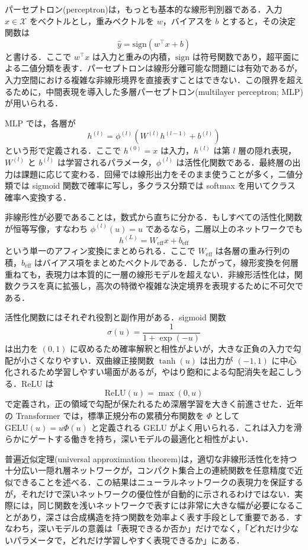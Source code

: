 パーセプトロン(perceptron)は，もっとも基本的な線形判別器である．入力 $x\in\mathcal X$ をベクトルとし，重みベクトルを $w$，バイアスを $b$ とすると，その決定関数は
\[
\hat y = \mathrm{sign}(w^\top x + b)
\]
と書ける．ここで $w^\top x$ は入力と重みの内積，$\mathrm{sign}$ は符号関数であり，超平面による二値分類を表す．パーセプトロンは線形分離可能な問題には有効であるが，入力空間における複雑な非線形境界を直接表すことはできない．この限界を超えるために，中間表現を導入した多層パーセプトロン(multilayer perceptron; MLP)が用いられる．

MLP では，各層が
\[
h^{(l)} = \phi^{(l)}(W^{(l)}h^{(l-1)} + b^{(l)})
\]
という形で定義される．ここで $h^{(0)}=x$ は入力，$h^{(l)}$ は第 $l$ 層の隠れ表現，$W^{(l)}$ と $b^{(l)}$ は学習されるパラメータ，$\phi^{(l)}$ は活性化関数である．最終層の出力は課題に応じて変わる．回帰では線形出力をそのまま使うことが多く，二値分類では sigmoid 関数で確率に写し，多クラス分類では softmax を用いてクラス確率へ変換する．

非線形性が必要であることは，数式から直ちに分かる．もしすべての活性化関数が恒等写像，すなわち $\phi^{(l)}(u)=u$ であるなら，二層以上のネットワークでも
\[
h^{(L)} = W_{\mathrm{eff}}x + b_{\mathrm{eff}}
\]
という単一のアフィン変換にまとめられる．ここで $W_{\mathrm{eff}}$ は各層の重み行列の積，$b_{\mathrm{eff}}$ はバイアス項をまとめたベクトルである．したがって，線形変換を何層重ねても，表現力は本質的に一層の線形モデルを超えない．非線形活性化は，関数クラスを真に拡張し，高次の特徴や複雑な決定境界を表現するために不可欠である．

活性化関数にはそれぞれ役割と副作用がある．sigmoid 関数
\[
\sigma(u)=\frac{1}{1+\exp(-u)}
\]
は出力を $(0,1)$ に収めるため確率解釈と相性がよいが，大きな正負の入力で勾配が小さくなりやすい．双曲線正接関数 $\tanh(u)$ は出力が $(-1,1)$ に中心化されるため学習しやすい場面があるが，やはり飽和による勾配消失を起こしうる．ReLU は
\[
\mathrm{ReLU}(u)=\max(0,u)
\]
で定義され，正の領域で勾配が保たれるため深層学習を大きく前進させた．近年の Transformer では，標準正規分布の累積分布関数を $\Phi$ として $\mathrm{GELU}(u)=u\Phi(u)$ と定義される GELU がよく用いられる．これは入力を滑らかにゲートする働きを持ち，深いモデルの最適化と相性がよい．

普遍近似定理(universal approximation theorem)は，適切な非線形活性化を持つ十分広い一隠れ層ネットワークが，コンパクト集合上の連続関数を任意精度で近似できることを述べる．この結果はニューラルネットワークの表現力を保証するが，それだけで深いネットワークの優位性が自動的に示されるわけではない．実際には，同じ関数を浅いネットワークで表すには非常に大きな幅が必要になることがあり，深さは合成構造を持つ関数を効率よく表す手段として重要である．すなわち，深いモデルの意義は「表現できるか否か」だけでなく，「どれだけ少ないパラメータで，どれだけ学習しやすく表現できるか」にある．

